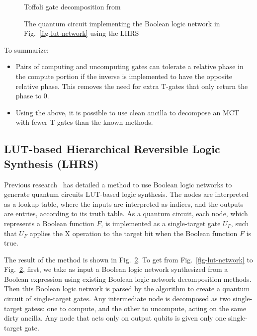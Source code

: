 \begin{figure}[t]
    \centering
    \scalebox{1}{}
    \caption{Toffoli gate decomposition from~\cite{bib-rtof-maslov}}
    \label{fig-maslov-decomp}
\end{figure}


\begin{figure}[t]
    \centering
    \scalebox{1}{}
    \caption{The quantum circuit implementing the Boolean logic network in Fig.~\ref{fig-lut-network} using the LHRS }
    \label{fig-lut-qc}
\end{figure}

To summarize:
\begin{itemize}
\item Pairs of computing and uncomputing gates can tolerate a relative phase in the compute portion if the inverse is implemented to have the opposite relative phase. This removes the need for extra T-gates that only return the phase to 0.
\item Using the above, it is possible to use clean ancilla to decompose an MCT with fewer T-gates than the known methods.
\end{itemize}



\subsection{LUT-based Hierarchical Reversible Logic Synthesis (LHRS)}
\label{Subsec:lhrs}

Previous research~\cite{bib-lhrs-soeken} has detailed a method to use Boolean logic
networks to generate quantum circuits  LUT-based logic 
synthesis.  The nodes are interpreted as a lookup table, 
where the inputs are interpreted as indices, and the outputs are entries, according 
to its truth table. As a quantum circuit, each node, which represents a Boolean function $F$,
is implemented as a single-target gate $U_{F}$, such that $U_{F}$ applies the X operation to
the target bit when the Boolean function $F$ is true.

The result of the method is shown in Fig.~\ref{fig-lut-qc}. To get from Fig.~\ref{fig-lut-network} to
Fig.~\ref{fig-lut-qc}, first, we take as input a Boolean logic network synthesized from a Boolean expression using
existing Boolean logic network decomposition methods. Then this Boolean logic network is parsed by the algorithm to
create a quantum circuit of single-target gates. Any intermediate node is decomposed as two single-target gatess:
one to compute, and the other to uncompute, acting on the same dirty ancilla. Any node that acts only on output
qubits is given only one single-target gate.

